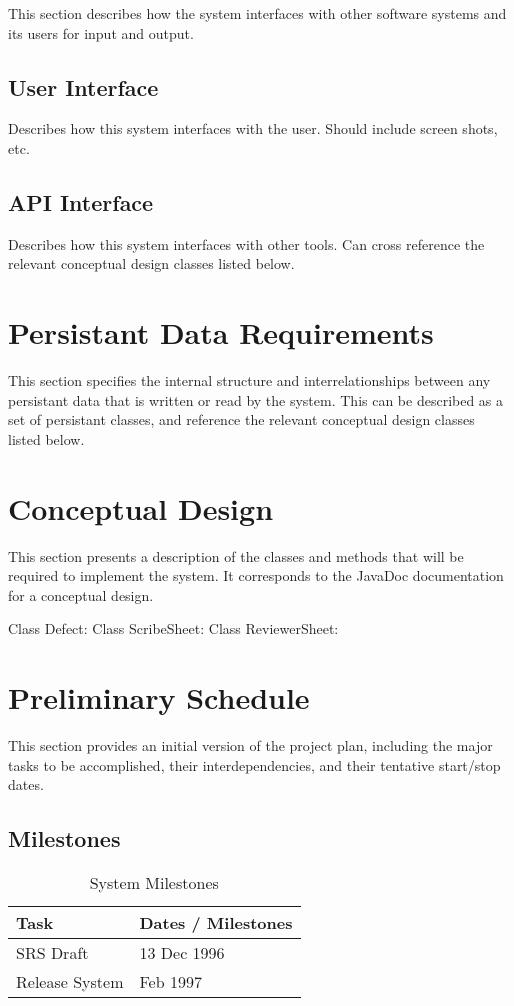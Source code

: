This section describes how the system interfaces with other software
systems and its users for input and output.

\subsection{User Interface}
Describes how this system interfaces with the user. Should include screen
shots, etc.

\subsection{API Interface}
Describes how this system interfaces with other tools. Can cross reference
the relevant conceptual design classes listed below.

\section{Persistant Data Requirements}

This section specifies the internal structure and interrelationships
between any persistant data that is written or read by the system. This can
be described as a set of persistant classes, and reference the relevant
conceptual design classes listed below.

\section{Conceptual Design}

This section presents a description of the classes and methods that will be
required to implement the system. It corresponds to the JavaDoc
documentation for a conceptual design.

Class Defect:
Class ScribeSheet:
Class ReviewerSheet:

\section{Preliminary Schedule}

This section provides an initial version of the project plan, including the
major tasks to be accomplished, their interdependencies, and their
tentative start/stop dates.

\subsection{Milestones}
\begin{table}[htbp]
  \caption{System Milestones}
  
  \begin{center}
    \begin{tabular}{|l|l|}\hline
      {\bf Task}&{\bf Dates / Milestones}\\ \hline \hline
      SRS Draft&13 Dec 1996\\ \hline
      Release System& Feb 1997\\ \hline
    \end{tabular}
  \end{center}
\end{table}


